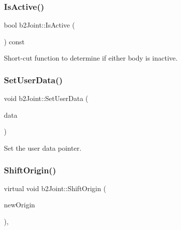 \mbox{\label{classb2_joint_ae9cfbd158216c9855c2f018ff3c9c922}} 
\subsubsection{\texorpdfstring{IsActive()}{IsActive()}}
{\footnotesize\ttfamily bool b2\+Joint\+::\+Is\+Active (\begin{DoxyParamCaption}{ }\end{DoxyParamCaption}) const}



Short-\/cut function to determine if either body is inactive. 

\mbox{\label{classb2_joint_a492f2d02496437572aaec6013ebdc1c8}} 
\subsubsection{\texorpdfstring{SetUserData()}{SetUserData()}}
{\footnotesize\ttfamily void b2\+Joint\+::\+Set\+User\+Data (\begin{DoxyParamCaption}\item[{void $\ast$}]{data }\end{DoxyParamCaption})\hspace{0.3cm}{\ttfamily [inline]}}



Set the user data pointer. 

\mbox{\label{classb2_joint_a7804f649e993dc0fd9ae47fde5601f90}} 
\subsubsection{\texorpdfstring{ShiftOrigin()}{ShiftOrigin()}}
{\footnotesize\ttfamily virtual void b2\+Joint\+::\+Shift\+Origin (\begin{DoxyParamCaption}\item[{const \mbox{\hyperlink{structb2_vec2}{b2\+Vec2}} \&}]{new\+Origin }\end{DoxyParamCaption})\hspace{0.3cm}{\ttfamily [inline]}, {\ttfamily [virtual]}}



